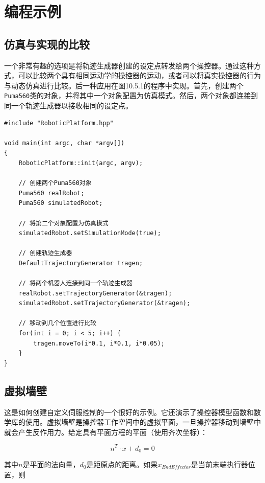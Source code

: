 \documentclass[UTF8,a4paper,12pt]{ctexart}
\begin{document}
\section{编程示例}

\subsection{仿真与实现的比较}

一个非常有趣的选项是将轨迹生成器创建的设定点转发给两个操控器。通过这种方式，可以比较两个具有相同运动学的操控器的运动，或者可以将真实操控器的行为与动态仿真进行比较。后一种应用在图10.5.1的程序中实现。首先，创建两个\texttt{Puma560}类的对象，并将其中一个对象配置为仿真模式。然后，两个对象都连接到同一个轨迹生成器以接收相同的设定点。

\begin{lstlisting}[caption={将相同轨迹转发给两个机器人的示例},label={lst:two-robots}]
#include "RoboticPlatform.hpp"

void main(int argc, char *argv[])
{
    RoboticPlatform::init(argc, argv);

    // 创建两个Puma560对象
    Puma560 realRobot;
    Puma560 simulatedRobot;

    // 将第二个对象配置为仿真模式
    simulatedRobot.setSimulationMode(true);

    // 创建轨迹生成器
    DefaultTrajectoryGenerator tragen;

    // 将两个机器人连接到同一个轨迹生成器
    realRobot.setTrajectoryGenerator(&tragen);
    simulatedRobot.setTrajectoryGenerator(&tragen);

    // 移动到几个位置进行比较
    for(int i = 0; i < 5; i++) {
        tragen.moveTo(i*0.1, i*0.1, i*0.05);
    }
}
\end{lstlisting}

\subsection{虚拟墙壁}

这是如何创建自定义伺服控制的一个很好的示例。它还演示了操控器模型函数和数学库的使用。虚拟墙壁是操控器工作空间中的虚拟平面，一旦操控器移动到墙壁中就会产生反作用力。给定具有平面方程的平面（使用齐次坐标）：

\begin{equation}
n^T \cdot x + d_0 = 0
\end{equation}

其中$n$是平面的法向量，$d_0$是距原点的距离。如果$x_{EndEffector}$是当前末端执行器位置，则
\end{document}
